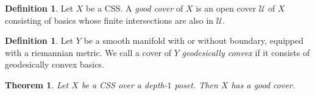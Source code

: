 \documentclass[11pt]{amsart}
\newcommand{\mcal}[1]{\mathcal{#1}}
\numberwithin{equation}{section}
\theoremstyle{definition}
\newtheorem{definition}[equation]{Definition}%
\theoremstyle{remark}
\theoremstyle{plain}
\newtheorem{theorem}[equation]{Theorem}
\begin{document}
\iffalse 

\begin{definition}
    Let $X$ be a CSS. A \emph{good cover} of $X$ is an open cover $\mcal{U}$ of $X$ consisting of basics whose finite intersections are also in $\mcal{U}$.
\end{definition}

\begin{definition}
    Let $Y$ be a smooth manifold with or without boundary, equipped with a riemannian metric. We call a cover of $Y$ \emph{geodesically convex} if it consists of geodesically convex basics.
\end{definition}


\begin{theorem}
    Let $X$ be a CSS {\color{MidnightBlue} over a depth-$1$ poset}. Then $X$ has a good cover.
\end{theorem}
\end{document}
